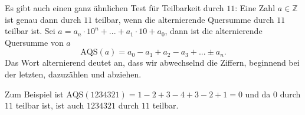 \documentclass[a4paper,ngerman,12pt]{scrartcl}
\newcommand{\Z}{\mathbb{Z}}
\theoremstyle{definition}
\begin{document}
Es gibt auch einen ganz ähnlichen Test für Teilbarkeit durch $11$: Eine Zahl $a \in \Z$ ist genau dann durch $11$ teilbar, wenn die alternierende Quersumme durch $11$ teilbar ist. Sei $a = a_n \cdot 10^n + ... + a_1 \cdot 10 + a_0$, dann ist die alternierende Quersumme von $a$
\[ \mathrm{AQS}(a) = a_0 - a_1 + a_2 - a_3 + ... \pm a_n. \]
Das Wort alternierend deutet an, dass wir abwechselnd die Ziffern, beginnend bei der letzten, dazuzählen und abziehen.

Zum Beispiel ist $\mathrm{AQS}(1234321) = 1 - 2 + 3 - 4 + 3 - 2 + 1 = 0$ und da $0$ durch $11$ teilbar ist, ist auch $1234321$ durch $11$ teilbar.
\end{document}

